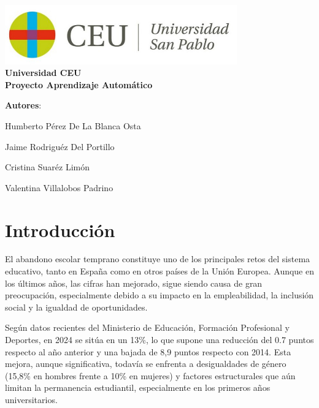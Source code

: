 \documentclass{report}[14pt]
\begin{document}
\begin{titlepage}
    \begin{center}
        \vspace*{\fill}  %
        \includegraphics[width=10cm]{ceu.png}\\[1cm]
        \textbf{\LARGE Universidad CEU}\\[1.5cm]
        \textbf{\LARGE  Proyecto Aprendizaje Automático}\\[2cm]
         {\Large \textbf{Autores}: \par}
        {\Large Humberto Pérez De La Blanca Osta\par}
        {\Large Jaime Rodriguéz Del Portillo\par}
        {\Large Cristina Suaréz Limón\par}
        {\Large  Valentina Villalobos Padrino \par}
        \vspace*{\fill}  %
    \end{center}
\end{titlepage}

\tableofcontents
\newpage

\chapter{Introducción}
El abandono escolar temprano constituye uno de los principales retos del sistema educativo, tanto en España como en otros países de la Unión Europea. Aunque en los últimos años, las cifras han mejorado, sigue siendo causa de gran preocupación, especialmente debido a su impacto en la empleabilidad, la inclusión social y la igualdad de oportunidades.

Según datos recientes del Ministerio de Educación, Formación Profesional y Deportes, en 2024 se sitúa en un 13\%, lo que supone una reducción del 0.7 puntos respecto al año anterior y una bajada de 8,9 puntos respecto con 2014. Esta mejora, aunque significativa, todavía se enfrenta a desigualdades de género (15,8\% en hombres frente a 10\% en mujeres) y factores estructurales que aún limitan la permanencia estudiantil, especialmente en los primeros años universitarios.
\end{document}
